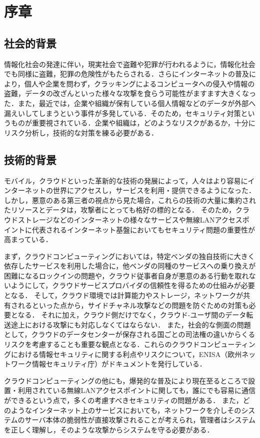 \chapter{序章}

\section{社会的背景}
情報化社会の発達に伴い，現実社会で盗難や犯罪が行われるように，情報化社会でも同様に盗難，犯罪の危険性がもたらされる．さらにインターネットの普及により，個人や企業を問わず，クラッキングによるコンピュータへの侵入や情報の盗難，データの改ざんといった様々な攻撃を食らう可能性がますます大きくなった．また，最近では，企業や組織が保有している個人情報などのデータが外部へ漏えいしてしまうという事件が多発している．そのため，セキュリティ対策というものが重要視されている．企業や組織は，どのようなリスクがあるか，十分にリスク分析し，技術的な対策を練る必要がある．

\section{技術的背景}
モバイル，クラウドといった革新的な技術の発展によって，人々はより容易にインターネットの世界にアクセスし，サービスを利用・提供できるようになった．
しかし，悪意のある第三者の視点から見た場合，これらの技術の大量に集約されたリソースとデータは，攻撃者にとっても格好の標的となる．
そのため，クラウドストレージなどのインターネットの様々なサービスや無線LANアクセスポイントに代表されるインターネット基盤においてもセキュリティ問題の重要性が高まっている．


まず，クラウドコンピューティングにおいては，特定ベンダの独自技術に大きく依存したサービスを利用した場合に，他ベンダの同種のサービスへの乗り換えが困難になるロックインの問題や，クラウド従事者自身が悪意のある行動を取れないようにして，クラウドサービスプロバイダの信頼性を得るための仕組みが必要となる．
そして，クラウド環境では計算能力やストレージ，ネットワークが共有されるといった点から，サイドチャネル攻撃などの問題を防ぐための対策も必要となる．
それに加え，クラウド側だけでなく，クラウド-ユーザ間のデータ転送途上における攻撃にも対応しなくてはならない．
また，社会的な側面の問題として，クラウドのデータセンターが保存される国ごとの司法権の違いからくるリスクを考慮することも重要な観点となる．これらのクラウドコンピューティングにおける情報セキュリティに関する利点やリスクについて，ENISA（欧州ネットワーク情報セキュリティ庁）がドキュメント\cite{cloudrisk}を発行している．


クラウドコンピューティングの他にも，爆発的な普及により現在至るところで設置・利用されている無線LANアクセスポイントに関しても，誰にでも容易に通信ができるという点で，多くの考慮すべきセキュリティの問題がある．
また，どのようなインターネット上のサービスにおいても，ネットワークを介しそのシステムのサーバ本体の脆弱性が直接攻撃されることが考えられ，管理者はシステムを正しく理解し，そのような攻撃からシステムを守る必要がある．

